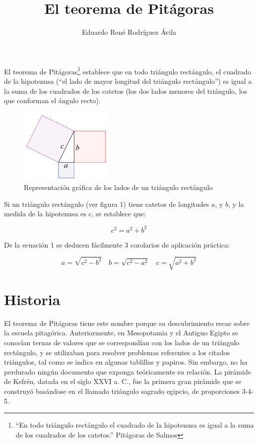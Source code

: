 \documentclass[12pt,letterpaper,twocolumn]{article}
\author{Eduardo René Rodríguez Ávila}
\title{El teorema de Pitágoras}
\begin{document}
	\maketitle
	

El teorema de Pitágoras\footnote{``En todo triángulo rectángulo el cuadrado de la hipotenusa es igual a la suma de los cuadrados de los catetos.'' Pitágoras de Salmos} establece que en todo triángulo rectángulo, el cuadrado de la hipotenusa (``el lado de mayor longitud del triángulo rectángulo'') es igual a la suma de los cuadrados de los catetos (los dos lados menores del triángulo, los que conforman el ángulo recto).

\begin{figure}[h] 
	\centering
	\includegraphics[width=0.4\textwidth]{img/pythagorean.png}
	\caption{Representación gráfica de los lados de un triángulo rectángulo}
\end{figure}

Si un triángulo rectángulo (ver figura 1) tiene catetos de longitudes $a$, y $b$, y la medida de la hipotenusa es $c$, se establece que:

\begin{equation}
	c^2 = a^2 + b^2
\end{equation}
  
De la ecuación 1 se deducen fácilmente 3 corolarios de aplicación práctica:

\[
a = \sqrt{c^2 - b^2} \quad  b = \sqrt{c^2-a^2} \quad  c = \sqrt{a^2 + b^2}
\]


\section{Historia}

El teorema de Pitágoras tiene este nombre porque su descubrimiento recae sobre la es\-cue\-la pitagórica. Anteriormente, en Mesopotamia y el Antiguo Egipto se conocían ternas de valores que se correspondían con los lados de un triángulo rectángulo, y se utilizaban para resolver problemas referentes a los citados triángulos, tal como se indica en algunas tablillas y papiros. Sin embargo, no ha perdurado ningún documento que exponga teóricamente su relación. La pirámide de Kefrén, datada en el siglo XXVI a. C., fue la primera gran pirámide que se construyó basándose en el llamado triángulo sagrado egipcio, de proporciones 3-4-5.
\end{document}
